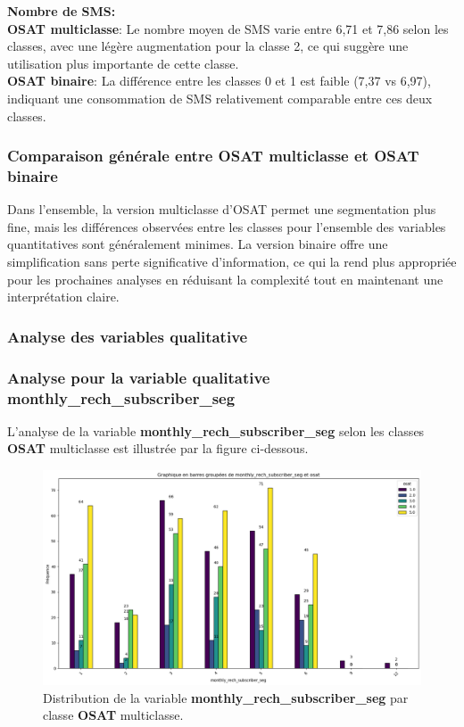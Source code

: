 \vspace{0.2cm}

\noindent \textbf{Nombre de SMS:} \\
\textbf{OSAT multiclasse}: Le nombre moyen de SMS varie entre 6,71 et 7,86 selon les classes, avec une légère augmentation pour la classe 2, ce qui suggère une utilisation plus importante de cette classe. \\
\textbf{OSAT binaire}: La différence entre les classes 0 et 1 est faible (7,37 vs 6,97), indiquant une consommation de SMS relativement comparable entre ces deux classes.

\vspace{0.2cm}

\subsubsection*{Comparaison générale entre OSAT multiclasse et OSAT binaire} 
Dans l'ensemble, la version multiclasse d'OSAT permet une segmentation plus fine, mais les différences observées entre les classes pour l'ensemble des variables quantitatives sont généralement minimes. La version binaire offre une simplification sans perte significative d'information, ce qui la rend plus appropriée pour les prochaines analyses en réduisant la complexité tout en maintenant une interprétation claire.

\subsubsection{Analyse des variables qualitative}
\subsubsection*{Analyse pour la variable qualitative \textbf{monthly\_rech\_subscriber\_seg}}

L'analyse de la variable \textbf{monthly\_rech\_subscriber\_seg} selon les classes \textbf{OSAT} multiclasse est illustrée par la figure ci-dessous.

\begin{figure}[H]
    \centering
    \includegraphics[width=0.7\linewidth]{barre_monthl_rech.png}
    \caption{Distribution de la variable \textbf{monthly\_rech\_subscriber\_seg} par classe \textbf{OSAT} multiclasse.}
    \label{fig:barre_monthl_rech}
\end{figure}

